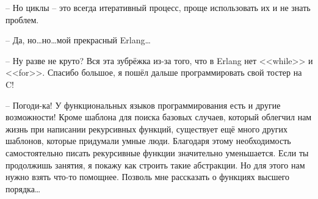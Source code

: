\documentclass[a4paper,12pt]{report}
\begin{document}
\--- Но циклы \--- это всегда итеративный процесс, проще использовать их и не знать проблем.

\--- Да, но\ldots но\ldots мой прекрасный Erlang\ldots

\--- Ну разве не круто? Вся эта зубрёжка из\--за того, что в Erlang нет <<while>> и <<for>>. Спасибо большое, я пошёл дальше программировать свой тостер на C!

\--- Погоди\--ка! У функциональных языков программирования есть и другие возможности! Кроме шаблона для поиска базовых случаев, который облегчил нам жизнь при написании рекурсивных функций, существует ещё много других шаблонов, которые придумали умные люди. Благодаря этому необходимость самостоятельно писать рекурсивные функции значительно уменьшается. Если ты продолжишь занятия, я покажу как строить такие абстракции. Но для этого нам нужно взять что\--то помощнее. Позволь мне рассказать о функциях высшего порядка\ldots
\end{document}
